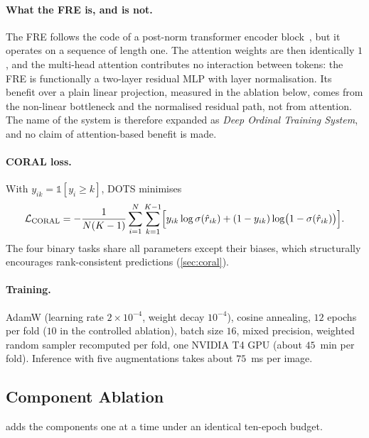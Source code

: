 \paragraph{What the FRE is, and is not.}
The FRE follows the code of a post-norm transformer encoder block~\cite{vaswani2017attention},
but it operates on a sequence of length one. The attention weights are then identically
$1$, and the multi-head attention contributes no interaction between tokens: the FRE is
functionally a two-layer residual MLP with layer normalisation. Its benefit over a plain
linear projection, measured in the ablation below, comes from the non-linear bottleneck and
the normalised residual path, not from attention. The name of the system is therefore
expanded as \emph{Deep Ordinal Training System}, and no claim of attention-based benefit is
made.

\paragraph{CORAL loss.}
With $y_{ik}=\mathbb{1}[y_i\geq k]$, DOTS minimises
\begin{equation}
\mathcal{L}_{\mathrm{CORAL}}=-\frac{1}{N(K-1)}\sum_{i=1}^{N}\sum_{k=1}^{K-1}
\Bigl[y_{ik}\log\sigma(\hat r_{ik})+(1-y_{ik})\log\bigl(1-\sigma(\hat r_{ik})\bigr)\Bigr].
\label{eq:coral}
\end{equation}
The four binary tasks share all parameters except their biases, which structurally
encourages rank-consistent predictions (\cref{sec:coral}).

\paragraph{Training.}
AdamW (learning rate $2\times10^{-4}$, weight decay $10^{-4}$), cosine annealing,
$12$ epochs per fold ($10$ in the controlled ablation), batch size $16$, mixed precision,
weighted random sampler recomputed per fold, one NVIDIA T4 GPU (about $45$~min per fold).
Inference with five augmentations takes about $75$~ms per image.

\subsection{Component Ablation}

 adds the components one at a time under an identical ten-epoch budget.

